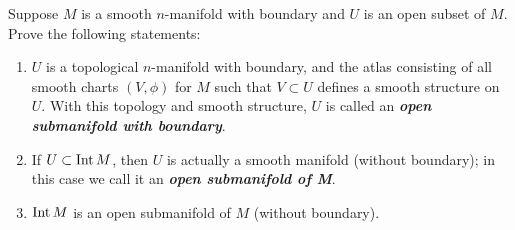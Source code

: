 \begin{customexer}{1.44}\label{exercise_1_44}
  Suppose $M$ is a smooth $n$-manifold with boundary and $U$ is an open subset of $M$.
  Prove the following statements:
  \begin{enumerate}[label=(\alph*)]
    \item
      $U$ is a topological $n$-manifold with boundary, and the atlas consisting of all smooth charts $(V, \phi)$ for $M$ such that $V \subset U$ defines a smooth structure on $U$.
      With this topology and smooth structure, $U$ is called an \textit{\textbf{open submanifold with boundary}}.
    \item
      If $U \subset \operatorname{Int} M$, then $U$ is actually a smooth manifold (without boundary); in this case we call it an \textit{\textbf{open submanifold of M}}.
    \item
      $\operatorname{Int} M$ is an open submanifold of $M$ (without boundary).
  \end{enumerate}
\end{customexer}

